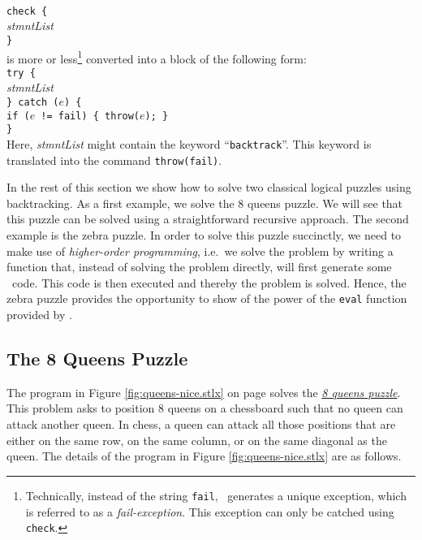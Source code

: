 \\[0.2cm]
\hspace*{1.3cm}
\texttt{check \{} 
\\
\hspace*{1.8cm}
\textsl{stmntList}
\\
\hspace*{1.3cm}
\texttt{\}}
\\[0.2cm]
is more or less\footnote{
Technically, instead of the string \texttt{fail}, \setlx\ 
generates a unique exception, which is referred to as a \emph{fail-exception}.
This exception can only be catched using \texttt{check}. 
}
converted into a block of the following form:
\\[0.2cm]
\hspace*{1.3cm}
\texttt{try \{} 
\\
\hspace*{1.8cm}
\textsl{stmntList}
\\
\hspace*{1.3cm}
\texttt{\} catch ($e$) \{}
\\
\hspace*{1.8cm}
\texttt{if ($e$ != fail) \{ throw($e$); \}}
\\
\hspace*{1.3cm}
\texttt{\}}
\\[0.2cm]
Here, \textsl{stmntList}  might contain the keyword ``\texttt{backtrack}''.  This keyword is
translated into the command \texttt{throw(\symbol{34}fail\symbol{34})}.   

In the rest of this section we show how to solve two classical logical puzzles using backtracking.
As a first example,  we solve the 8 queens puzzle.  We will see that this puzzle can be solved using
a straightforward recursive approach.  The second example is the zebra puzzle.  In order to solve
this puzzle succinctly, we need to make use of \emph{higher-order programming}, i.e.~we solve the
problem by writing a function that, instead of solving the problem directly, will first generate
some \setlx\ code.  This code is then executed and thereby the problem is solved.  Hence, the zebra
puzzle provides the opportunity to show of the power of the \texttt{eval} function provided by \setlx.

\subsection{The 8 Queens Puzzle}
The program in Figure \ref{fig:queens-nice.stlx} on page
\pageref{fig:queens-nice.stlx} solves the 
\href{http://en.wikipedia.org/wiki/Eight_queens_puzzle}{\emph{8 queens puzzle}}.  This problem asks to
position 8 queens on a chessboard such that no queen can attack another queen.  In chess, a queen
can attack all those positions that are either on the same row, on the same column, or on the
same diagonal as the queen.  The details of the program in Figure \ref{fig:queens-nice.stlx}
are as follows.


